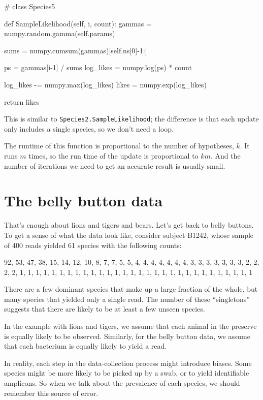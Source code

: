 \documentclass[12pt]{book}
\theoremstyle{exercise}
\newcommand{\py}[1]{{\tt #1}}%
\begin{document}
\begin{code}
# class Species5

    def SampleLikelihood(self, i, count):
        gammas = numpy.random.gamma(self.params)

        sums = numpy.cumsum(gammas)[self.ns[0]-1:]

        ps = gammas[i-1] / sums
        log_likes = numpy.log(ps) * count

        log_likes -= numpy.max(log_likes)
        likes = numpy.exp(log_likes)

        return likes
\end{code}

This is similar to \py{Species2.SampleLikelihood}; the
difference is that each update only includes a single species,
so we don't need a loop.

The runtime of this function is proportional to the number
of hypotheses, $k$.  It runs $m$ times, so the run time of
the update is proportional to $k m$.
And the number of iterations we
need to get an accurate result is usually small.


\section{The belly button data}
\label{belly}

That's enough about lions and tigers and bears.
Let's get back to belly buttons.  To get a sense of what the
data look like, consider subject B1242,
whose sample of 400 reads yielded 61 species with the following
counts:

\begin{code}
92, 53, 47, 38, 15, 14, 12, 10, 8, 7, 7, 5, 5,
4, 4, 4, 4, 4, 4, 4, 3, 3, 3, 3, 3, 3, 3, 2, 2, 2, 2,
1, 1, 1, 1, 1, 1, 1, 1, 1, 1, 1, 1, 1, 1, 1, 1, 1, 1,
1, 1, 1, 1, 1, 1, 1, 1, 1, 1, 1, 1
\end{code}

There are a few dominant species that make up a large
fraction of the whole, but many species that yielded only
a single read.  The number of these ``singletons'' suggests
that there are likely to be at least a few unseen species.

In the example with lions and tigers, we assume that each
animal in the preserve is equally likely to be observed.
Similarly, for the belly button data, we assume that each
bacterium is equally likely to yield a read.

In reality, each step in the data-collection
process might introduce biases.  Some species might
be more likely to be picked up by a swab, or to yield identifiable
amplicons.  So when we talk about the prevalence of each species,
we should remember this source of error.
\end{document}
